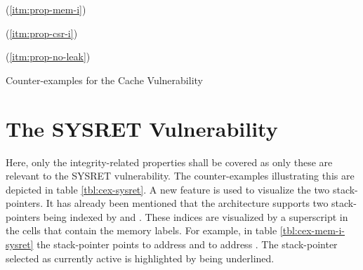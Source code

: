 \begin{table}
    \begin{subtable}{\textwidth}
        \centering
        
        \caption{ (\ref{itm:prop-mem-i})}
        \label{tbl:cex-mem-i-cache-vuln}
    \end{subtable}

    \begin{subtable}{\textwidth}
        \centering
        
        \caption{ (\ref{itm:prop-csr-i})}
        \label{tbl:cex-csr-i-cache-vuln}
    \end{subtable}

    \begin{subtable}{\textwidth}
        \centering
        
        \caption{ (\ref{itm:prop-no-leak})}
        \label{tbl:cex-no-leak-cache-vuln}
    \end{subtable}
    \caption{Counter-examples for the Cache Vulnerability}
    \label{tbl:cex-cache-vuln}
\end{table}

\section{The SYSRET Vulnerability}
\label{sec:cexs-sysret}

Here, only the integrity-related properties shall be covered as only these are relevant to the SYSRET vulnerability.
The counter-examples illustrating this are depicted in table \ref{tbl:cex-sysret}.
A new feature is used to visualize the two stack-pointers.
It has already been mentioned that the architecture supports two stack-pointers being indexed by  and .
These indices are visualized by a superscript in the cells that contain the memory labels.
For example, in table \ref{tbl:cex-mem-i-sysret} the stack-pointer  points to address  and  to address .
The stack-pointer selected as currently active is highlighted by being underlined.

